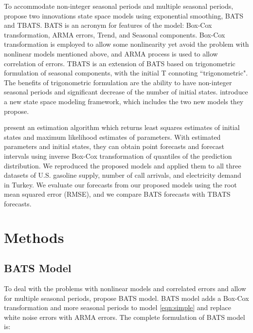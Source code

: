 \documentclass{uwstat572}
\begin{document}
To accommodate non-integer seasonal periods and multiple seasonal periods, \citet{de2011forecasting} propose two innovations state space models using exponential smoothing, BATS and TBATS. BATS is an acronym for features of the model: Box-Cox transformation, ARMA errors, Trend, and Seasonal components. Box-Cox transformation is employed to allow some nonlinearity yet avoid the problem with nonlinear models mentioned above, and ARMA process is used to allow correlation of errors. TBATS is an extension of BATS based on trigonometric formulation of seasonal components, with the initial T connoting ``trigonometric". The benefits of trigonometric formulation are the ability to have non-integer seasonal periods and significant decrease of the number of initial states. \citet{de2011forecasting} introduce a new state space modeling framework, which includes the two new models they propose.  

\citet{de2011forecasting} present an estimation algorithm which returns least squares estimates of initial states and maximum likelihood estimates of parameters. With estimated parameters and initial states, they can obtain point forecasts and forecast intervals using inverse Box-Cox transformation of quantiles of the prediction distribution. We reproduced the proposed models and  applied them to all three datasets of U.S. gasoline supply, number of call arrivals, and electricity demand in Turkey. We evaluate our forecasts from our proposed models using the root mean squared error (RMSE), and we compare BATS forecasts with TBATS forecasts.

\section{Methods}
\subsection{BATS Model}
\hspace{4ex}To deal with the problems with nonlinear models and correlated errors and allow for multiple seasonal periods, \citet{de2011forecasting} propose BATS model. BATS model adds a Box-Cox transformation and more seasonal periods to model \ref{eqn:simple} and replace white noise errors with ARMA errors. The complete formulation of BATS model is:  
\end{document}
